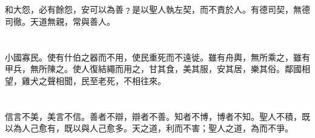 \documentclass[11pt,oneside]{article}
\begin{document}
\section{}
\label{sec:orgheadline78}
和大怨，必有餘怨，安可以為善﹖是以聖人執左契，而不責於人。有德司契，無德司徹。天道無親，常與善人。

\section{}
\label{sec:orgheadline79}
小國寡民。使有什伯之器而不用，使民重死而不遠徙。雖有舟輿，無所乘之，雖有甲兵，無所陳之。使人復結繩而用之，甘其食，美其服，安其居，樂其俗。鄰國相望，雞犬之聲相聞，民至老死，不相往來。

\section{}
\label{sec:orgheadline80}
信言不美，美言不信。善者不辯，辯者不善。知者不博，博者不知。聖人不積，既以為人己愈有，既以與人己愈多。天之道，利而不害；聖人之道，為而不爭。
\end{document}
